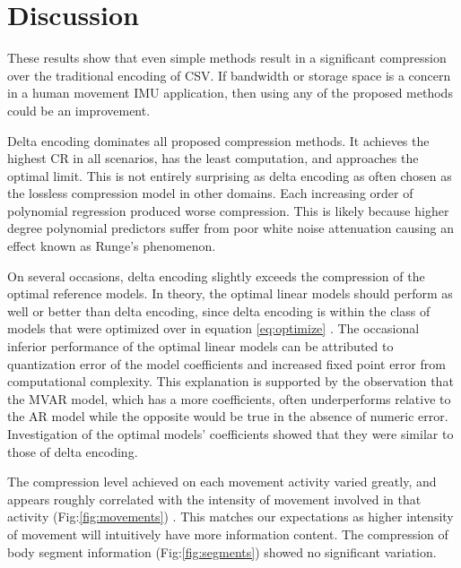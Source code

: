 \documentclass[journal]{IEEEtran}
\begin{document}
\begin{table}[htbp]
{\begin{tabular}{|l|r|r|r|r|r|r|r|r|r|r|r|r|}
\end{tabular}%
}%

\end{table}



\section{Discussion}

These results show that even simple methods result in a significant compression over the traditional encoding of CSV. If bandwidth or storage space is a concern in a human movement IMU application, then using any of the proposed methods could be an improvement.

Delta encoding dominates all proposed compression methods. It achieves the highest CR in all scenarios, has the least computation, and approaches the optimal limit. This is not entirely surprising as delta encoding as often chosen as the lossless compression model in other domains\cite{Blalock2018}\cite{Coalson2008}. Each increasing order of polynomial regression produced worse compression. This is likely because higher degree polynomial predictors suffer from poor white noise attenuation \cite{Tanskanen2000} causing an effect known as Runge's phenomenon.

On several occasions, delta encoding slightly exceeds the compression of the optimal reference models. In theory, the optimal linear models should perform as well or better than delta encoding, since delta encoding is within the class of models that were optimized over in equation \eqref{eq:optimize} . The occasional inferior performance of the optimal linear models can be attributed to quantization error of the model coefficients and increased fixed point error from computational complexity. This explanation is supported by the observation that the MVAR model, which has a more coefficients, often underperforms relative to the AR model while the opposite would be true in the absence of numeric error. Investigation of the optimal models' coefficients showed that they were similar to those of delta encoding.

The compression level achieved on each movement activity varied greatly, and appears roughly correlated with the intensity of movement involved in that activity (Fig:\ref{fig:movements}) . This matches our expectations as higher intensity of movement will intuitively have more information content. The compression of body segment information (Fig:\ref{fig:segments}) showed no significant variation.
\end{document}
